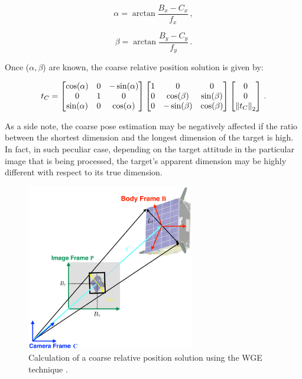 \begin{equation}
  \alpha = \arctan{\frac{B_x - C_x}{f_x}} \,,
\end{equation}

\begin{equation}
  \beta = \arctan{\frac{B_y - C_y}{f_y}} \,.
\end{equation}

Once ($\alpha, \beta$) are known, the coarse relative position solution is given by:

\begin{equation}
  t_C
  =
  \begin{bmatrix}
    \cos(\alpha) & 0 & -\sin(\alpha) \\
    0            & 1 & 0             \\
    \sin(\alpha) & 0 & \cos(\alpha)
  \end{bmatrix}
  \begin{bmatrix}
    1 & 0            & 0           \\
    0 & \cos(\beta)  & \sin(\beta) \\
    0 & -\sin(\beta) & \cos(\beta)
  \end{bmatrix}
  \begin{bmatrix}
    0            \\
    0            \\
    \left\lVert t_C\right\rVert_2
  \end{bmatrix} \,.
\end{equation}

As a side note, the coarse pose estimation may be negatively affected if the ratio between the shortest dimension and the longest dimension of the target is high. In fact, in such peculiar case, depending on the target attitude in the particular image that is being processed, the target's apparent dimension may be highly different with respect to its true dimension.

\begin{figure}[htbp]
  \centering
  \includegraphics[width=0.65\textwidth]{gfx/coarsePoseEstimation.eps}
  \caption{Calculation of a coarse relative position solution using the WGE technique \cite{Sharma2018}.}
  \label{fig:coarseRelative}
\end{figure}

